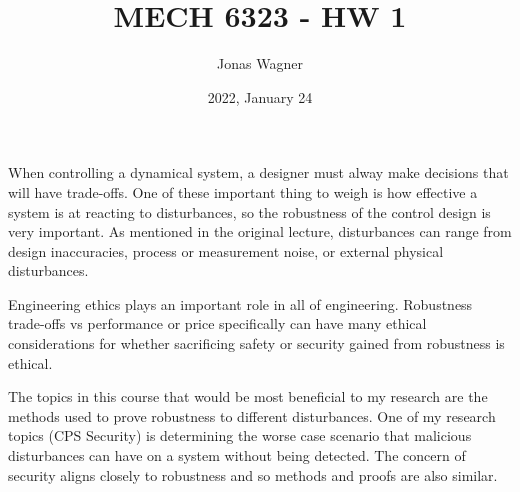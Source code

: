 \documentclass[letter]{article}
\title{MECH 6323 - HW 1}
\author{Jonas Wagner}
\date{2022, January 24}
\numberwithin{equation}{section}
\begin{document}
	

\maketitle



When controlling a dynamical system, a designer must alway make decisions that will have trade-offs.
One of these important thing to weigh is how effective a system is at reacting to disturbances, so the robustness of the control design is very important.
As mentioned in the original lecture, disturbances can range from design inaccuracies, process or measurement noise, or external physical disturbances.

Engineering ethics plays an important role in all of engineering.
Robustness trade-offs vs performance or price specifically can have many ethical considerations for whether sacrificing safety or security gained from robustness is ethical.

The topics in this course that would be most beneficial to my research are the methods used to prove robustness to different disturbances.
One of my research topics (CPS Security) is determining the worse case scenario that malicious disturbances can have on a system without being detected.
The concern of security aligns closely to robustness and so methods and proofs are also similar.
\end{document}

